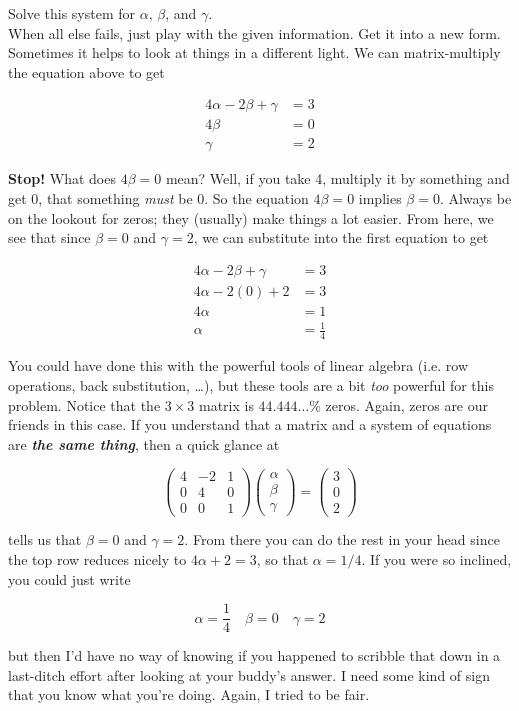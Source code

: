 \documentclass{article}
\def\a{\alpha}
\def\b{\beta}
\def\c{\gamma}
\begin{document}
Solve this system for $\a$, $\b$, and $\c$.\\

When all else fails, just play with the given information. Get it into a new form. Sometimes it helps to look at things in a different light. We can matrix-multiply the equation above to get


\begin{align*}
4 \a - 2 \b + \c &= 3 \\
4 \b &= 0 \\
\c & = 2
\end{align*}

\textbf{Stop!} What does $4 \b = 0$ mean? Well, if you take 4, multiply it by something and get 0, that something \textit{must} be 0. So the equation $4 \b = 0$ implies $\b = 0$. Always be on the lookout for zeros; they (usually) make things a lot easier. From here, we see that since $\b = 0$ and $\c = 2$, we can substitute into the first equation to get

\begin{align*}
4 \a - 2 \b + \c &= 3 \\
4 \a - 2 (0) + 2 &= 3 \\
4 \a &= 1 \\
\a &= \frac{1}{4}
\end{align*}

You could have done this with the powerful tools of linear algebra (i.e. row operations, back substitution, \dots ), but these tools are a bit \textit{too} powerful for this problem. Notice that the $3 \times 3$ matrix is $44.444\dots$\% zeros. Again, zeros are our friends in this case. If you understand that a matrix and a system of equations are \textit{\textbf{the same thing}}, then a quick glance at 

\[
\begin{pmatrix} 4 & -2 & 1 \\ 0 & 4 & 0 \\ 0 & 0 & 1 \end{pmatrix} \begin{pmatrix} \a \\ \b \\ \c \end{pmatrix} = \begin{pmatrix} 3 \\ 0 \\ 2 \end{pmatrix}
\]

{\setlength{\parindent}{0cm}
tells us that $\b = 0$ and $\c = 2$. From there you can do the rest in your head since the top row reduces nicely to $4 \a + 2 = 3$, so that $\a = 1/4$. If you were so inclined, you could just write
}

\[
\a = \frac{1}{4} \quad \b = 0 \quad \c = 2
\]

{\setlength{\parindent}{0cm}
but then I'd have no way of knowing if you happened to scribble that down in a last-ditch effort after looking at your buddy's answer. I need some kind of sign that you know what you're doing. Again, I tried to be fair. 
}
\end{document}
